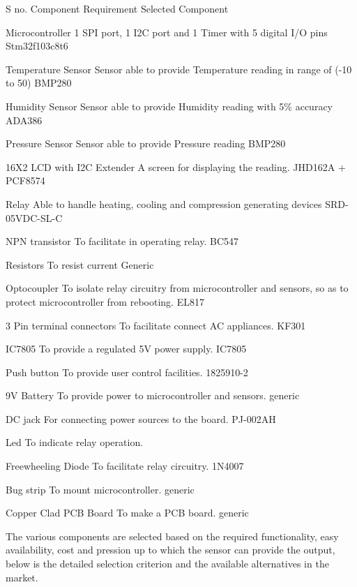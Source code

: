 S no. Component Requirement Selected Component
\begin{DoxyEnumerate}
\item Microcontroller 1 SPI port, 1 I2C port and 1 Timer with 5 digital I/O pins Stm32f103c8t6
\item Temperature Sensor Sensor able to provide Temperature reading in range of (-\/10 to 50) BMP280
\item Humidity Sensor Sensor able to provide Humidity reading with 5\% accuracy ADA386
\item Pressure Sensor Sensor able to provide Pressure reading BMP280
\item 16X2 LCD with I2C Extender A screen for displaying the reading. JHD162A + PCF8574
\item Relay Able to handle heating, cooling and compression generating devices SRD-\/05\+VDC-\/\+SL-\/C
\item NPN transistor To facilitate in operating relay. BC547
\item Resistors To resist current Generic
\item Optocoupler To isolate relay circuitry from microcontroller and sensors, so as to protect microcontroller from rebooting. EL817
\item 3 Pin terminal connectors To facilitate connect AC appliances. KF301
\item IC7805 To provide a regulated 5V power supply. IC7805
\item Push button To provide user control facilities. 1825910-\/2 ~\newline

\item 9V Battery To provide power to microcontroller and sensors. generic
\item DC jack For connecting power sources to the board. PJ-\/002\+AH
\item Led To indicate relay operation. ~\newline

\item Freewheeling Diode To facilitate relay circuitry. 1N4007
\item Bug strip To mount microcontroller. generic
\item Copper Clad PCB Board To make a PCB board. generic
\end{DoxyEnumerate}

The various components are selected based on the required functionality, easy availability, cost and pression up to which the sensor can provide the output, below is the detailed selection criterion and the available alternatives in the market.


